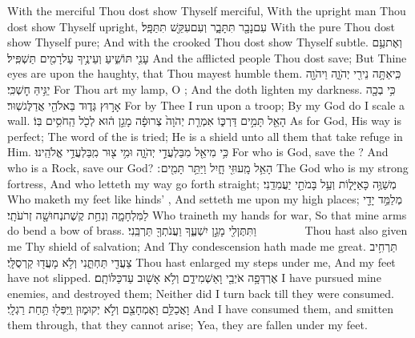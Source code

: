 {With the merciful Thou dost show Thyself merciful, With the upright man Thou dost show Thyself upright,}
{עִם\maqqaf נָבָ֖ר תִּתָּבָ֑ר וְעִם\maqqaf עִקֵּ֖שׁ תִּתַּפָּֽל׃}
{With the pure Thou dost show Thyself pure; And with the crooked Thou dost show Thyself subtle.}
{וְאֶת\maqqaf עַ֥ם עָנִ֖י תּוֹשִׁ֑יעַ וְעֵינֶ֥יךָ עַל\maqqaf רָמִ֖ים תַּשְׁפִּֽיל׃}
{And the afflicted people Thou dost save; But Thine eyes are upon the haughty, that Thou mayest humble them.}
{כִּֽי\maqqaf אַתָּ֥ה נֵירִ֖י יְהֹוָ֑ה וַיהֹוָ֖ה יַגִּ֥יהַּ חׇשְׁכִּֽי׃}
{For Thou art my lamp, O \lord; And the \lord\space doth lighten my darkness.}
{כִּ֥י בְכָ֖ה אָר֣וּץ גְּד֑וּד בֵּאלֹהַ֖י אֲדַלֶּג\maqqaf שֽׁוּר׃}
{For by Thee I run upon a troop; By my God do I scale a wall.}
{הָאֵ֖ל תָּמִ֣ים דַּרְכּ֑וֹ אִמְרַ֤ת יְהֹוָה֙ צְרוּפָ֔ה מָגֵ֣ן ה֔וּא לְכֹ֖ל הַֽחֹסִ֥ים בּֽוֹ׃}
{As for God, His way is perfect; The word of the \lord\space is tried; He is a shield unto all them that take refuge in Him.}
{כִּ֥י מִי\maqqaf אֵ֖ל מִבַּלְעֲדֵ֣י יְהֹוָ֑ה וּמִ֥י צ֖וּר מִֽבַּלְעֲדֵ֥י אֱלֹהֵֽינוּ׃}
{For who is God, save the \lord? And who is a Rock, save our God?}
{הָאֵ֥ל מָֽעוּזִּ֖י חָ֑יִל וַיַּתֵּ֥ר תָּמִ֖ים ׃}
{The God who is my strong fortress, And who letteth my way go forth straight;}
{מְשַׁוֶּ֥ה  כָּאַיָּל֑וֹת וְעַ֥ל בָּמֹתַ֖י יַעֲמִדֵֽנִי׃}
{Who maketh my feet like hinds’ , And setteth me upon my high places;}
{מְלַמֵּ֥ד יָדַ֖י לַמִּלְחָמָ֑ה וְנִחַ֥ת קֶשֶׁת\maqqaf נְחוּשָׁ֖ה זְרֹעֹתָֽי׃}
{Who traineth my hands for war, So that mine arms do bend a bow of brass.}
{וַתִּתֶּן\maqqaf לִ֖י מָגֵ֣ן יִשְׁעֶ֑ךָ וַעֲנֹתְךָ֖ תַּרְבֵּֽנִי׃        }
{Thou hast also given me Thy shield of salvation; And Thy condescension hath made me great.}
{תַּרְחִ֥יב צַעֲדִ֖י תַּחְתֵּ֑נִי וְלֹ֥א מָעֲד֖וּ קַרְסֻלָּֽי׃}
{Thou hast enlarged my steps under me, And my feet have not slipped.}
{אֶרְדְּפָ֥ה אֹיְבַ֖י וָאַשְׁמִידֵ֑ם וְלֹ֥א אָשׁ֖וּב עַד\maqqaf כַּלּוֹתָֽם׃}
{I have pursued mine enemies, and destroyed them; Neither did I turn back till they were consumed.}
{וָאֲכַלֵּ֥ם וָאֶמְחָצֵ֖ם וְלֹ֣א יְקוּמ֑וּן וַֽיִּפְּל֖וּ תַּ֥חַת רַגְלָֽי׃}
{And I have consumed them, and smitten them through, that they cannot arise; Yea, they are fallen under my feet.}
